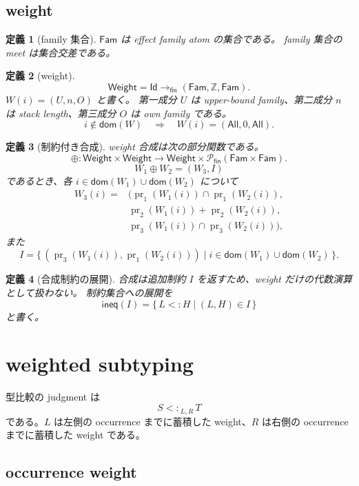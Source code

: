 \documentclass[uplatex,dvipdfmx,a4paper,11pt]{jsarticle}
\theoremstyle{jpplain}
\newtheorem{definition}{定義}[section]
\newcommand{\Fam}{\mathsf{Fam}}
\newcommand{\Id}{\mathsf{Id}}
\newcommand{\Weight}{\mathsf{Weight}}
\newcommand{\fin}{\mathsf{fin}}
\newcommand{\dom}{\mathsf{dom}}
\newcommand{\All}{\mathsf{All}}
\newcommand{\subty}[3]{#1\mathrel{<:}_{#2,#3}}
\newcommand{\compose}{\mathbin{\oplus}}
\begin{document}
\subsection{weight}

\begin{definition}[family 集合]
\(\Fam\) は effect family atom の集合である。
family 集合の meet は集合交差である。
\end{definition}

\begin{definition}[weight]
\[
  \Weight = \Id \to_{\fin} (\Fam,\mathbb Z,\Fam).
\]
\(W(i)=(U,n,O)\) と書く。
第一成分 \(U\) は upper-bound family、第二成分 \(n\) は stack length、第三成分 \(O\) は own family である。
\[
  i\notin\dom(W)\quad\Rightarrow\quad W(i)=(\All,0,\All).
\]
\end{definition}

\begin{definition}[制約付き合成]
weight 合成は次の部分関数である。
\[
  \compose : \Weight\times\Weight \to \Weight\times \mathcal P_{\fin}(\Fam\times\Fam).
\]
\[
  W_1\compose W_2=(W_3,I)
\]
であるとき、各 \(i\in\dom(W_1)\cup\dom(W_2)\) について
\[
\begin{aligned}
 W_3(i)
  ={}&(\operatorname{pr}_1(W_1(i))\cap \operatorname{pr}_1(W_2(i)),\\
     &\operatorname{pr}_2(W_1(i))+\operatorname{pr}_2(W_2(i)),\\
     &\operatorname{pr}_3(W_1(i))\cap \operatorname{pr}_3(W_2(i))),
\end{aligned}
\]
また
\[
  I=\{\,(\operatorname{pr}_3(W_1(i)),\operatorname{pr}_1(W_2(i)))\mid
       i\in\dom(W_1)\cup\dom(W_2)\,\}.
\]
\end{definition}

\begin{definition}[合成制約の展開]
合成は追加制約 \(I\) を返すため、weight だけの代数演算として扱わない。
制約集合への展開を
\[
  \mathsf{ineq}(I)=\{\,L<:H\mid (L,H)\in I\,\}
\]
と書く。
\end{definition}

\section{weighted subtyping}

型比較の judgment は
\[
  \subty{S}{L}{R}\,T
\]
である。\(L\) は左側の occurrence までに蓄積した weight、\(R\) は右側の occurrence までに蓄積した weight である。

\subsection{occurrence weight}
\end{document}
